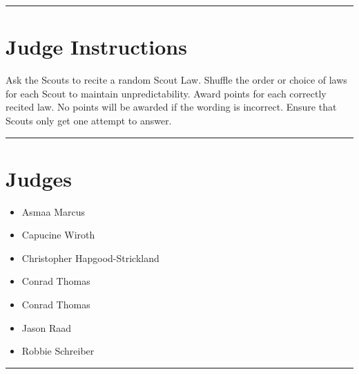 \documentclass[10pt]{article}
\begin{document}
	\vspace{0.5cm}
	\hrule
	\vspace{0.5cm}

		\section*{Judge Instructions}
		Ask the Scouts to recite a random Scout Law. Shuffle the order or choice of laws for each Scout to maintain unpredictability. Award points for each correctly recited law. No points will be awarded if the wording is incorrect. Ensure that Scouts only get one attempt to answer.


\vspace{0.5cm}
	\hrule
	\vspace{0.5cm}
		\section*{\faUsers \: Judges}

		

	\begin{multicols}{2}

		\begin{itemize}
									\item Asmaa Marcus
									\item Capucine Wiroth
									\item Christopher Hapgood-Strickland
									\item Conrad Thomas
						\end{itemize}

		\vfill\null
		\columnbreak

		\begin{itemize}
									\item Conrad Thomas
									\item Jason Raad
									\item Robbie Schreiber
						\end{itemize}

		\vfill\null

		\end{multicols}



			\vspace{0.5cm}
	\hrule
	\vspace{0.5cm}
\end{document}
